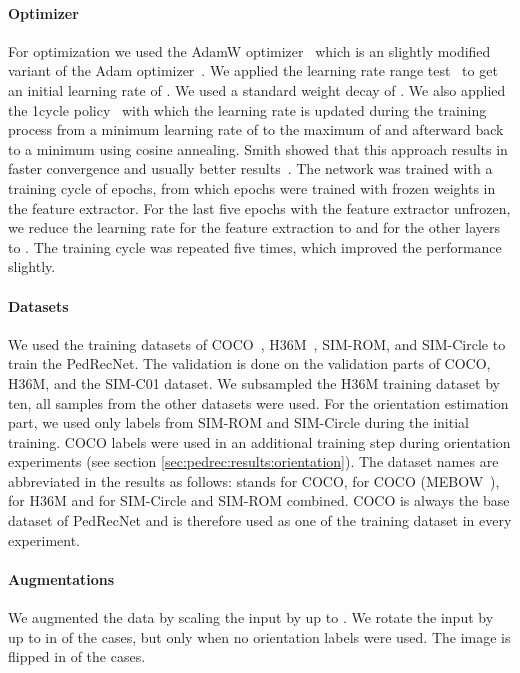 \documentclass[a4paper, 10pt, conference]{ieeeconf}
\begin{document}
\paragraph{Optimizer}
For optimization we used the AdamW optimizer~\cite{loshchilovDecoupledWeightDecay2019} which is an slightly modified variant of the Adam optimizer~\cite{kingmaAdamMethodStochastic2015}. We applied the learning rate range test~\cite{smithCyclicalLearningRates2017a} to get an initial learning rate of . We used a standard weight decay of . We also applied the 1cycle policy~\cite{smithDisciplinedApproachNeural2018} with which the learning rate is updated during the training process from a minimum learning rate of  to the maximum of  and afterward back to a minimum using cosine annealing. Smith showed that this approach results in faster convergence and usually better results~\cite{smithCyclicalLearningRates2017a}. The network was trained with a training cycle of  epochs, from which  epochs were trained with frozen weights in the feature extractor. For the last five epochs with the feature extractor unfrozen, we reduce the learning rate for the feature extraction to  and for the other layers to . The training cycle was repeated five times, which improved the performance slightly.

\paragraph{Datasets}
We used the training datasets of COCO~\cite{linMicrosoftCOCOCommon2014}, H36M~\cite{ionescuHuman36MLarge2014}, SIM-ROM, and SIM-Circle to train the PedRecNet. The validation is done on the validation parts of COCO, H36M, and the SIM-C01 dataset. We subsampled the H36M training dataset by ten, all samples from the other datasets were used. For the orientation estimation part, we used only labels from SIM-ROM and SIM-Circle during the initial training. COCO labels were used in an additional training step during orientation experiments (see section \ref{sec:pedrec:results:orientation}). The dataset names are abbreviated in the results as follows:  stands for COCO,  for COCO (MEBOW~\cite{wuMEBOWMonocularEstimation2020}),  for H36M and  for SIM-Circle and SIM-ROM combined. COCO is always the base dataset of PedRecNet and is therefore used as one of the training dataset in every experiment.

\paragraph{Augmentations} We augmented the data by scaling the input by up to . We rotate the input by up to  in  of the cases, but only when no orientation labels were used. The image is flipped in  of the cases.
\end{document}
